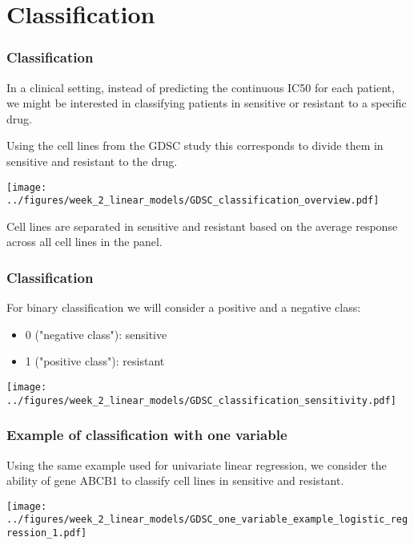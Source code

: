 \documentclass[notes]{beamer}          %
\begin{document}
\section{Classification}

\begin{frame}
\frametitle{Classification}
In a clinical setting, instead of predicting the continuous IC50 for each patient, we might be interested in classifying patients in sensitive or resistant to a specific drug.

\vspace{5mm} 

Using the cell lines from the GDSC study this corresponds to divide them in sensitive and resistant to the drug. 

\begin{center}
\texttt{[image: ../figures/week\_2\_linear\_models/GDSC\_classification\_overview.pdf]}
\end{center}

Cell lines are separated in sensitive and resistant based on the average response across all cell lines in the panel.

\end{frame}

\begin{frame}
\frametitle{Classification}

For binary classification we will consider a positive and a negative class:

\begin{itemize}
    \item 0 ("negative class"): sensitive
    \item 1 ("positive class"): resistant
\end{itemize}

\begin{center}
\texttt{[image: ../figures/week\_2\_linear\_models/GDSC\_classification\_sensitivity.pdf]}
\end{center}
\end{frame}


\begin{frame}
\frametitle{Example of classification with one variable}

Using the same example used for univariate linear regression, we consider the ability of gene ABCB1 to classify cell lines in sensitive and resistant.

\begin{center}
\texttt{[image: ../figures/week\_2\_linear\_models/GDSC\_one\_variable\_example\_logistic\_regression\_1.pdf]}
\end{center}

\end{frame}
\end{document}
